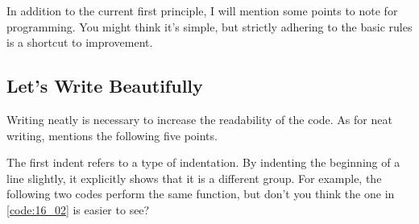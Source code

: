 \documentclass{ltjsbook}
\begin{document}
In addition to the current first principle, I will mention some points to note for programming. You might think it's simple, but strictly adhering to the basic rules is a shortcut to improvement.


\subsection{Let's Write Beautifully}
Writing neatly is necessary to increase the readability of the code. As for neat writing, \textcite{Matsuura201610} mentions the following five points.



The first indent refers to a type of indentation. By indenting the beginning of a line slightly, it explicitly shows that it is a different group. For example, the following two codes perform the same function, but don't you think the one in \ref{code:16_02} is easier to see?

\end{document}
